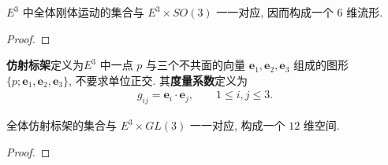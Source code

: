 \documentclass[../../main.tex]{subfiles}%
\begin{document}
\begin{proposition}
$E^3$ 中全体刚体运动的集合与 $E^3\times SO(3)$ 一一对应, 因而构成一个 $6$ 维流形.
\end{proposition}
\begin{proof}



\end{proof}

\begin{definition}[仿射标架]
\textbf{仿射标架}定义为$E^3$ 中一点 $p$ 与三个不共面的向量 $\bm e_1,\bm e_2,\bm e_3$ 组成的图形 $\{p;\bm e_1,\bm e_2,\bm e_3\}$, 不要求单位正交. 其\textbf{度量系数}定义为
\begin{align*}
g_{ij} = \bm e_i\cdot\bm e_j,\qquad 1\leqslant i,j\leqslant 3.
\end{align*}
\end{definition}

\begin{proposition}
全体仿射标架的集合与 $E^3\times GL(3)$ 一一对应, 构成一个 $12$ 维空间.
\end{proposition}
\begin{proof}



\end{proof}
\end{document}
